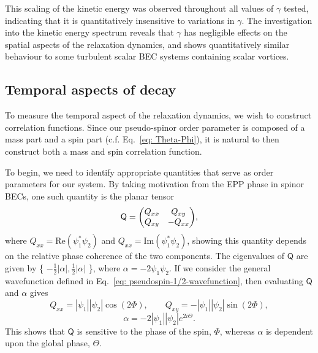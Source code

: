 This scaling of the kinetic energy was observed throughout all values of
\(\gamma \) tested, indicating that it is quantitatively insensitive to variations
in \(\gamma \).
The investigation into the kinetic energy spectrum reveals that \(\gamma \) has
negligible effects on the spatial aspects of the relaxation dynamics, and shows
quantitatively similar behaviour to some turbulent scalar BEC systems
containing scalar vortices.

\subsection{Temporal aspects of decay}
To measure the temporal aspect of the relaxation dynamics, we wish to
construct correlation functions.
Since our pseudo-spinor order parameter is composed of a mass part and a spin
part (c.f. Eq.~\eqref{eq: Theta-Phi}), it is natural to then construct both a
mass and spin correlation function.\par
To begin, we need to identify appropriate quantities that serve as order
parameters for our system.
By taking motivation from the EPP phase in spinor BECs, one such quantity is
the planar tensor~\cite{Symes2017}
\begin{equation}
    \mathsf{Q} = \mqty(Q_{xx} & Q_{xy} \\ Q_{xy} & -Q_{xx}),
\end{equation}
where \(Q_{xx} = \mathrm{Re}(\psi_1^*\psi_2)\) and
\(Q_{xx} = \mathrm{Im}(\psi_1^*\psi_2)\), showing this quantity depends on the
relative phase coherence of the two components.
The eigenvalues of \(\mathsf{Q}\) are given by
\{ \(-\frac{1}{2}|\alpha|, \frac{1}{2}|\alpha|\) \}, where
\(\alpha=-2\psi_1\psi_2\).
If we consider the general wavefunction defined in
Eq.~\eqref{eq: pseudospin-1/2-wavefunction}, then evaluating \(\mathsf{Q}\) and
\(\alpha \) gives
\begin{equation}
    Q_{xx} = |\psi_1||\psi_2|\cos({2\Phi}), \qquad 
    Q_{xy} = -|\psi_1||\psi_2|\sin({2\Phi}),
\end{equation}
\begin{equation}
    \alpha = -2|\psi_1||\psi_2|e^{2i\Theta}.
\end{equation}
This shows that \(\mathsf{Q}\) is sensitive to the phase of the spin,
\( \Phi \), whereas \(\alpha \) is dependent upon the global phase,
\( \Theta \).

